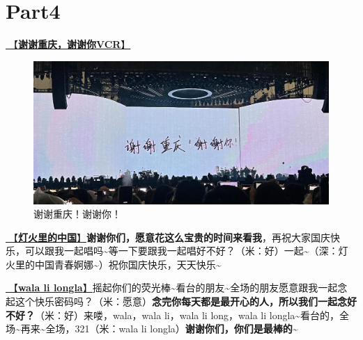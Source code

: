 \documentclass[]{ctexbook}
\begin{document}
\section{Part4}\label{chongqing-20241007-part4}

\hyperref[thank-you-vcr]{🎥【\textbf{谢谢重庆，谢谢你VCR}】}

\begin{figure}

{\centering \includegraphics[width=400pt]{img/chongqing20241007/thank-chongqing} 

}

\caption{谢谢重庆！谢谢你！}\label{fig:unnamed-chunk-121}
\end{figure}

\hyperref[China-in-the-lights]{🎵【\textbf{灯火里的中国}】}\textbf{谢谢你们，愿意花这么宝贵的时间来看我}，再祝大家国庆快乐，可以跟我一起唱吗\textasciitilde 等一下要跟我一起唱好不好？（米：好）一起\textasciitilde（深：灯火里的中国青春婀娜\textasciitilde）祝你国庆快乐，天天快乐\textasciitilde{}

\hyperref[wala-li-longla]{🎵【\textbf{wala li longla}】}摇起你们的荧光棒\textasciitilde 看台的朋友\textasciitilde 全场的朋友愿意跟我一起念起这个快乐密码吗？（米：愿意）\textbf{念完你每天都是最开心的人，所以我们一起念好不好？}（米：好）来喽，wala，wala li，wala li long，wala li longla\textasciitilde 看台的，全场\textasciitilde 再来\textasciitilde 全场，321（米：wala li longla）\textbf{谢谢你们，你们是最棒的\textasciitilde{}}
\end{document}
